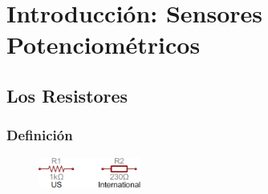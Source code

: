\documentclass[12pt, fleqn]{article}                            %
\theoremstyle{break}                                            %
\begin{document}
\restoregeometry                                                    %
\nopagecolor                                                        %




\tableofcontents{}
\label{sec:Index}

\clearpage



\section{Introducción: Sensores Potenciométricos}


    \subsection{Los Resistores}


        \subsubsection{Definición}

            \begin{figure}
                \centering
                \includegraphics[width=0.30\textwidth]{Resistencias}
            \end{figure}
\end{document}
